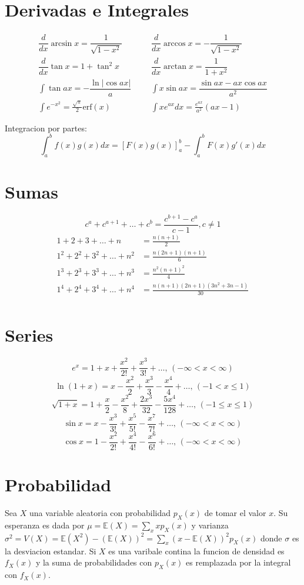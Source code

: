 \section{Derivadas e Integrales}
\begin{align*}
	\dfrac{d}{dx}\arcsin x = \dfrac{1}{\sqrt{1-x^2}} &&& \dfrac{d}{dx}\arccos x = -\dfrac{1}{\sqrt{1-x^2}} \\
	\dfrac{d}{dx}\tan x = 1+\tan^2 x &&& \dfrac{d}{dx}\arctan x = \dfrac{1}{1+x^2} \\
	\int\tan ax = -\dfrac{\ln|\cos ax|}{a} &&& \int x\sin ax = \dfrac{\sin ax-ax \cos ax}{a^2} \\
	\int e^{-x^2} = \frac{\sqrt \pi}{2} \text{erf}(x) &&& \int xe^{ax}dx = \frac{e^{ax}}{a^2}(ax-1)
\end{align*}

Integracion por partes:
\[\int_a^bf(x)g(x)dx = [F(x)g(x)]_a^b-\int_a^bF(x)g'(x)dx\]

\section{Sumas}
\[ c^a + c^{a+1} + \dots + c^{b} = \frac{c^{b+1} - c^a}{c-1}, c \neq 1 \]
\begin{align*}
	1 + 2 + 3 + \dots + n &= \frac{n(n+1)}{2} \\
	1^2 + 2^2 + 3^2 + \dots + n^2 &= \frac{n(2n+1)(n+1)}{6} \\
	1^3 + 2^3 + 3^3 + \dots + n^3 &= \frac{n^2(n+1)^2}{4} \\
	1^4 + 2^4 + 3^4 + \dots + n^4 &= \frac{n(n+1)(2n+1)(3n^2 + 3n - 1)}{30} \\
\end{align*}

\section{Series}
$$e^x = 1+x+\frac{x^2}{2!}+\frac{x^3}{3!}+\dots,\,(-\infty<x<\infty)$$
$$\ln(1+x) = x-\frac{x^2}{2}+\frac{x^3}{3}-\frac{x^4}{4}+\dots,\,(-1<x\leq1)$$
$$\sqrt{1+x} = 1+\frac{x}{2}-\frac{x^2}{8}+\frac{2x^3}{32}-\frac{5x^4}{128}+\dots,\,(-1\leq x\leq1)$$
$$\sin x = x-\frac{x^3}{3!}+\frac{x^5}{5!}-\frac{x^7}{7!}+\dots,\,(-\infty<x<\infty)$$
$$\cos x = 1-\frac{x^2}{2!}+\frac{x^4}{4!}-\frac{x^6}{6!}+\dots,\,(-\infty<x<\infty)$$

\section{Probabilidad}
Sea $X$ una variable aleatoria con probabilidad $p_X(x)$ de tomar el valor $x$. Su esperanza es dada por $\mu=\mathbb{E}(X)=\sum_xxp_X(x)$ y varianza $\sigma^2=V(X)=\mathbb{E}(X^2)-(\mathbb{E}(X))^2=\sum_x(x-\mathbb{E}(X))^2p_X(x)$ donde $\sigma$ es la desviacion estandar. Si $X$ es una varibale contina la funcion de densidad es $f_X(x)$ y la suma de probabilidades con $p_X(x)$ es remplazada por la integral con $f_X(x)$.

